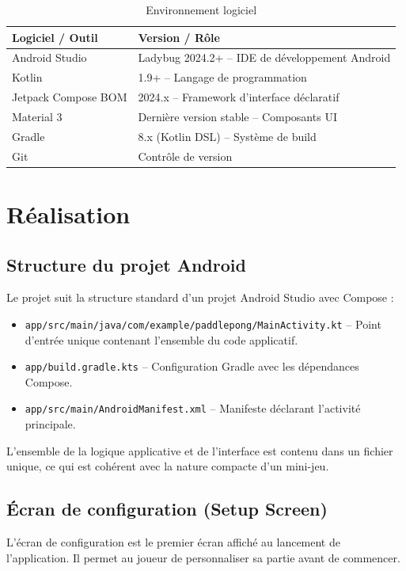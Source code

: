 \documentclass[12pt,a4paper]{report}
\begin{document}
\begin{table}[H]
\centering
\caption{Environnement logiciel}
\label{tab:env_soft}
\begin{tabularx}{\textwidth}{lX}
\toprule
\textbf{Logiciel / Outil} & \textbf{Version / R\^ole} \\
\midrule
Android Studio & Ladybug 2024.2+ -- IDE de d\'eveloppement Android \\
Kotlin & 1.9+ -- Langage de programmation \\
Jetpack Compose BOM & 2024.x -- Framework d'interface d\'eclaratif \\
Material 3 & Derni\`ere version stable -- Composants UI \\
Gradle & 8.x (Kotlin DSL) -- Syst\`eme de build \\
Git & Contr\^ole de version \\
\bottomrule
\end{tabularx}
\end{table}

\section{R\'ealisation}

\subsection{Structure du projet Android}
Le projet suit la structure standard d'un projet Android Studio avec Compose :
\begin{itemize}
    \item \texttt{app/src/main/java/com/example/paddlepong/MainActivity.kt} -- Point d'entr\'ee unique contenant l'ensemble du code applicatif.
    \item \texttt{app/build.gradle.kts} -- Configuration Gradle avec les d\'ependances Compose.
    \item \texttt{app/src/main/AndroidManifest.xml} -- Manifeste d\'eclarant l'activit\'e principale.
\end{itemize}

L'ensemble de la logique applicative et de l'interface est contenu dans un fichier unique, ce qui est coh\'erent avec la nature compacte d'un mini-jeu.

\subsection{\'Ecran de configuration (Setup Screen)}
L'\'ecran de configuration est le premier \'ecran affich\'e au lancement de l'application. Il permet au joueur de personnaliser sa partie avant de commencer.
\end{document}

